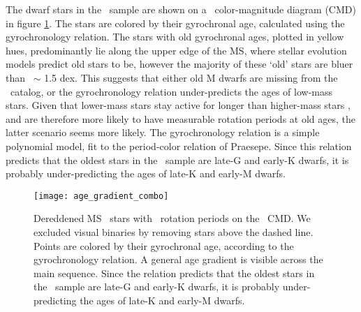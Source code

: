 The dwarf stars in the \mct\ sample are shown on a \gaia\ color-magnitude
diagram (CMD) in figure \ref{fig:age_gradient}.
The stars are colored by their gyrochronal age, calculated using the
\citep{angus2019} gyrochronology relation.
The stars with old gyrochronal ages, plotted in yellow hues, predominantly lie
along the upper edge of the MS, where stellar evolution models predict old
stars to be, however the majority of these `old' stars are bluer than \gcolor\
$\sim$ 1.5 dex.
This suggests that either old M dwarfs are missing from the \mct\ catalog, or
the \citet{angus2019} gyrochronology relation under-predicts the ages of
low-mass stars.
Given that lower-mass stars stay active for longer than higher-mass stars
\citep[\eg][]{west2011}, and are therefore more likely to have measurable
rotation periods at old ages, the latter scenario seems more likely.
The \citep{angus2019} gyrochronology relation is a simple polynomial model,
fit to the period-color relation of Praesepe.
Since this relation predicts that the oldest stars in the \mct\ sample are
late-G and early-K dwarfs, it is probably under-predicting the ages of late-K
and early-M dwarfs.
\begin{figure}
  \caption{
Dereddened MS \kepler\ stars with \mct\ rotation periods on the \gaia\ CMD.
We excluded visual binaries by removing stars above the dashed line.
    Points are colored by their gyrochronal
    age, according to the
    \citet{angus2019} gyrochronology relation.
    A general age gradient is visible across the main sequence.
    Since the \citet{angus2019} relation predicts that the oldest stars in
    the \mct\ sample are late-G and early-K dwarfs, it is probably
    under-predicting the ages of late-K and early-M dwarfs.
}
  \centering
    \texttt{[image: age\_gradient\_combo]}
\label{fig:age_gradient}
\end{figure}


